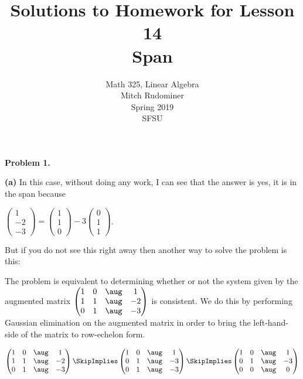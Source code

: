 \documentclass[oneside,12pt]{amsart}
\begin{document}
\title{Solutions to Homework for Lesson 14 \\ Span}
\author{Math 325, Linear Algebra \\  Mitch Rudominer \\ Spring 2019\\ SFSU }
\date{}

\maketitle


\textbf{Problem 1.}

\textbf{(a)} In this case, without doing any work, I can see that the answer is
yes, it is in the span because

\bigskip

$
\begin{pmatrix}
1 \\ -2 \\ -3
\end{pmatrix}
=
\begin{pmatrix}
1 \\ 1 \\ 0
\end{pmatrix}
-
3
\begin{pmatrix}
0 \\ 1 \\ 1
\end{pmatrix}
$.

\bigskip

But if you do not see this right away then another way to solve the problem
is this:

The problem is equivalent to determining whether or not
the system given by the augmented matrix
$
\begin{pmatrix}
1 & 0 & \aug &   1 \\
1 & 1 & \aug &  -2 \\
0 & 1 & \aug &  -3 \\
\end{pmatrix}
$
is consistent. We do this by performing Gaussian elimination on the augmented
matrix in order to bring the left-hand-side of the matrix to row-echelon form.

\bigskip


$
\begin{pmatrix}
1 & 0 & \aug &   1 \\
1 & 1 & \aug &  -2 \\
0 & 1 & \aug &  -3 \\
\end{pmatrix}
\SkipImplies
\begin{pmatrix}
1 & 0 & \aug & 1 \\
0 & 1 & \aug & -3 \\
0 & 1 & \aug & -3
\end{pmatrix}
\SkipImplies
\begin{pmatrix}
1 & 0 & \aug & 1 \\
0 & 1 & \aug & -3 \\
0 & 0 & \aug & 0
\end{pmatrix}
$
\end{document}

